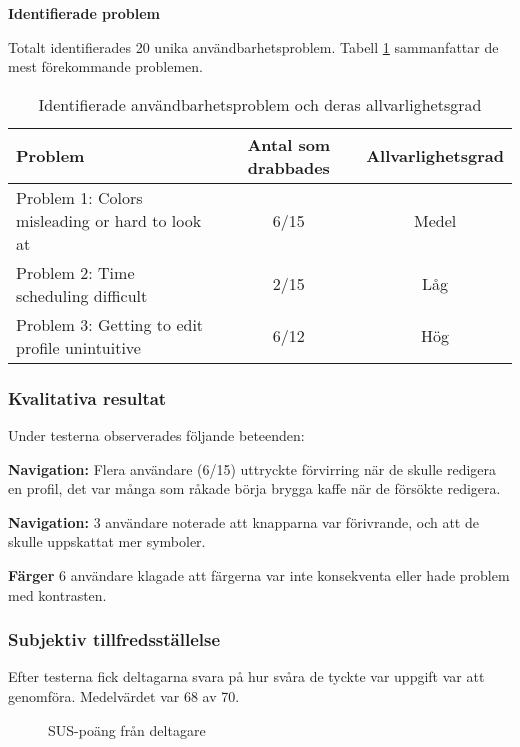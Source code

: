 \textbf{Identifierade problem}

Totalt identifierades 20 unika användbarhetsproblem. Tabell \ref{tab:problem} sammanfattar de mest förekommande problemen.
\begin{table}[h]
\centering
\begin{tabular}{|p{6cm}|c|c|}
\hline
\textbf{Problem} & \textbf{Antal som drabbades} & \textbf{Allvarlighetsgrad} \\
\hline
Problem 1: Colors misleading or hard to look at & 6/15 & Medel\\
Problem 2: Time scheduling difficult & 2/15 &  Låg \\
Problem 3: Getting to edit profile unintuitive & 6/12 & Hög\\
\hline
\end{tabular}
\caption{Identifierade användbarhetsproblem och deras allvarlighetsgrad}
\label{tab:problem}
\end{table}


\subsubsection{Kvalitativa resultat}

Under testerna observerades följande beteenden:

\textbf{Navigation:} Flera användare (6/15) uttryckte förvirring när de skulle redigera en profil, det var många som råkade börja brygga kaffe när de försökte redigera.

\textbf{Navigation:} 3 användare noterade att knapparna var förivrande, och att de skulle uppskattat mer symboler. 

\textbf{Färger} 6 användare klagade att färgerna var inte konsekventa eller hade problem med kontrasten. 


\subsubsection{Subjektiv tillfredsställelse}

Efter testerna fick deltagarna svara på hur svåra de tyckte var uppgift var att genomföra. Medelvärdet var 68 av 70.

\begin{figure}[h]
    \centering
    \caption{SUS-poäng från deltagare}
    \label{fig:sus}
\end{figure}


